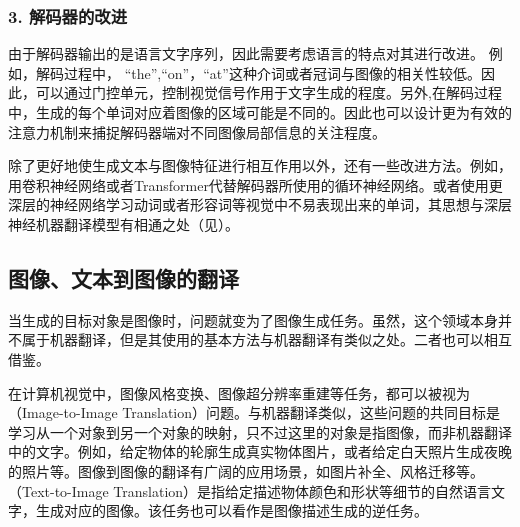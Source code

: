 
\subsubsection{3. 解码器的改进}

\parinterval 由于解码器输出的是语言文字序列，因此需要考虑语言的特点对其进行改进。 例如，解码过程中， “the”,“on”，“at”这种介词或者冠词与图像的相关性较低。因此，可以通过门控单元，控制视觉信号作用于文字生成的程度。另外,在解码过程中，生成的每个单词对应着图像的区域可能是不同的。因此也可以设计更为有效的注意力机制来捕捉解码器端对不同图像局部信息的关注程度。

\parinterval 除了更好地使生成文本与图像特征进行相互作用以外，还有一些改进方法。例如，用卷积神经网络或者Transformer代替解码器所使用的循环神经网络。或者使用更深层的神经网络学习动词或者形容词等视觉中不易表现出来的单词，其思想与深层神经机器翻译模型有相通之处（见{\chapterfifteen}）。


\subsection{图像、文本到图像的翻译}

\parinterval 当生成的目标对象是图像时，问题就变为了图像生成任务。虽然，这个领域本身并不属于机器翻译，但是其使用的基本方法与机器翻译有类似之处。二者也可以相互借鉴。

\parinterval 在计算机视觉中，图像风格变换、图像超分辨率重建等任务，都可以被视为{\small{}}（Image-to-Image Translation）问题。与机器翻译类似，这些问题的共同目标是学习从一个对象到另一个对象的映射，只不过这里的对象是指图像，而非机器翻译中的文字。例如，给定物体的轮廓生成真实物体图片，或者给定白天照片生成夜晚的照片等。图像到图像的翻译有广阔的应用场景，如图片补全、风格迁移等。{\small{}}（Text-to-Image Translation）是指给定描述物体颜色和形状等细节的自然语言文字，生成对应的图像。该任务也可以看作是图像描述生成的逆任务。

